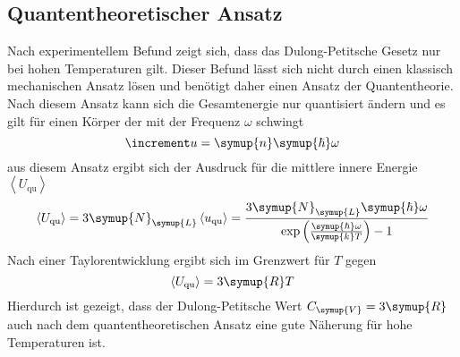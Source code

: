 \subsection{Quantentheoretischer Ansatz}
Nach experimentellem Befund zeigt sich, dass das Dulong-Petitsche Gesetz
nur bei hohen Temperaturen gilt. Dieser Befund lässt sich nicht durch
einen klassisch mechanischen Ansatz lösen und benötigt daher einen
Ansatz der Quantentheorie. Nach diesem Ansatz kann sich die Gesamtenergie
nur quantisiert ändern und es gilt für einen Körper der mit der Frequenz
$\omega$ schwingt
\begin{equation}
  \increment u = \symup{n}\symup{\hbar}\omega
\end{equation}
aus diesem Ansatz ergibt sich der Ausdruck für die mittlere innere Energie
$\left<U_\text{qu}\right>$
\begin{equation}
  \left<U_\text{qu}\right> = 3\symup{N}_\symup{L}\left<u_\text{qu}\right>
  = \frac{3\symup{N}_\symup{L}\symup{\hbar}\omega}
  {\exp\left(\frac{\symup{\hbar}\omega}{\symup{k}T}\right)-1}
\end{equation}
Nach einer Taylorentwicklung ergibt sich im Grenzwert für $T$ gegen
\infty
\begin{equation}
  \left<U_\text{qu}\right> = 3\symup{R}T
\end{equation}
Hierdurch ist gezeigt, dass der Dulong-Petitsche Wert $C_\symup{V}=3\symup{R}$
auch nach dem quantentheoretischen Ansatz eine gute Näherung für
hohe Temperaturen ist.
